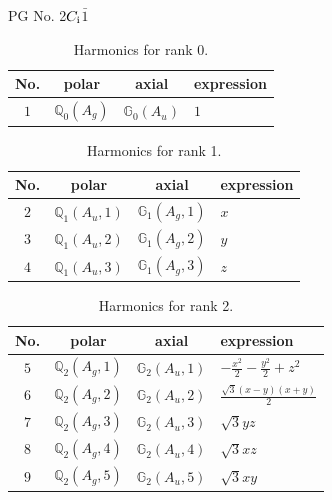 \documentclass[fleqn,8pt,landscape]{jsarticle}
\begin{document}
\setcounter{MaxMatrixCols}{32}

\renewcommand{\tablename}{Table~}
\renewcommand{\figurename}{Figure~}
\begin{center}
\LARGE
PG No. 2\quad$C_{\rm i}$\quad$\bar{1}$\quad[ triclinic ]
\end{center}
\begin{table}[ht!]
\begin{center}
\caption{Harmonics for rank 0.}
\renewcommand{\arraystretch}{1.3}
\begin{tabular}{cccl} \hline \hline
No. & polar & axial & expression \\ \hline
$ 1 $ & $ \mathbb{Q}_{0}(A_{g}) $ & $ \mathbb{G}_{0}(A_{u}) $ & $ 1 $ \\
 \hline \hline
\end{tabular}
\end{center}
\end{table}
\begin{table}[ht!]
\begin{center}
\caption{Harmonics for rank 1.}
\renewcommand{\arraystretch}{1.3}
\begin{tabular}{cccl} \hline \hline
No. & polar & axial & expression \\ \hline
$ 2 $ & $ \mathbb{Q}_{1}(A_{u},1) $ & $ \mathbb{G}_{1}(A_{g},1) $ & $ x $ \\
$ 3 $ & $ \mathbb{Q}_{1}(A_{u},2) $ & $ \mathbb{G}_{1}(A_{g},2) $ & $ y $ \\
$ 4 $ & $ \mathbb{Q}_{1}(A_{u},3) $ & $ \mathbb{G}_{1}(A_{g},3) $ & $ z $ \\
 \hline \hline
\end{tabular}
\end{center}
\end{table}
\begin{table}[ht!]
\begin{center}
\caption{Harmonics for rank 2.}
\renewcommand{\arraystretch}{1.3}
\begin{tabular}{cccl} \hline \hline
No. & polar & axial & expression \\ \hline
$ 5 $ & $ \mathbb{Q}_{2}(A_{g},1) $ & $ \mathbb{G}_{2}(A_{u},1) $ & $ - \frac{x^{2}}{2} - \frac{y^{2}}{2} + z^{2} $ \\
$ 6 $ & $ \mathbb{Q}_{2}(A_{g},2) $ & $ \mathbb{G}_{2}(A_{u},2) $ & $ \frac{\sqrt{3} \left(x - y\right) \left(x + y\right)}{2} $ \\
$ 7 $ & $ \mathbb{Q}_{2}(A_{g},3) $ & $ \mathbb{G}_{2}(A_{u},3) $ & $ \sqrt{3} y z $ \\
$ 8 $ & $ \mathbb{Q}_{2}(A_{g},4) $ & $ \mathbb{G}_{2}(A_{u},4) $ & $ \sqrt{3} x z $ \\
$ 9 $ & $ \mathbb{Q}_{2}(A_{g},5) $ & $ \mathbb{G}_{2}(A_{u},5) $ & $ \sqrt{3} x y $ \\
 \hline \hline
\end{tabular}
\end{center}
\end{table}
\end{document}
